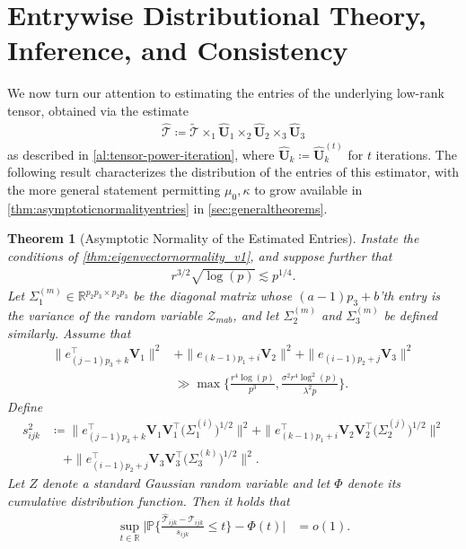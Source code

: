 \documentclass[10pt]{article}
\newcommand{\0}{{\mathbf{0}}}
\newcommand{\1}{{\mathbf{1}}}
\renewcommand{\t}{^{\top}}
\newcommand{\uhat}{\mathbf{\hat{U}}}
\newtheorem{theorem}{Theorem}
\newcommand{\p}{\mathbb{P}}
\renewcommand{\tilde}{\widetilde}
\renewcommand{\hat}{\widehat}
\renewcommand{\hat}{\widehat}
\begin{document}
\section{Entrywise Distributional Theory, Inference, and Consistency}
\label{sec:entries}

We now turn our attention to estimating the entries of the underlying low-rank tensor, obtained via the estimate
\begin{align*}
    \mathcal{\hat T} \coloneqq \mathcal{\tilde T} \times_1 \uhat_1 \times_2 \uhat_2 \times_3 \uhat_3
\end{align*}
as described in \cref{al:tensor-power-iteration}, where $\uhat_k \coloneqq \uhat_k^{(t)}$ for $t$ iterations.  The following result characterizes the distribution of the entries of this estimator, with the more general statement permitting $\mu_0, \kappa$ to grow available in \cref{thm:asymptoticnormalityentries} in \cref{sec:generaltheorems}.

\begin{theorem}[Asymptotic Normality of the Estimated Entries] \label{thm:asymptoticnormalityentries_v1}  Instate the conditions of \cref{thm:eigenvectornormality_v1}, and suppose further that
\begin{align*}
  r^{3/2} \sqrt{\log(p)} \lesssim p^{1/4}.
\end{align*}
 Let $\Sigma^{(m)}_1 \in \mathbb{R}^{p_2 p_3 \times p_2 p_3}$ be the diagonal matrix whose $(a-1)p_3 + b$'th entry is the variance of the random variable $\mathcal{Z}_{mab}$, and let $\Sigma^{(m)}_2$ and $\Sigma^{(m)}_3$ be defined similarly.  Assume that
\begin{align*}
   \| e_{(j-1)p_3 + k}\t \mathbf{V}_1 \|^2& + \|e_{(k-1)p_1 + i} \mathbf{V}_2  \|^2 + \| e_{(i-1)p_2 + j} \mathbf{V}_3\|^2 \\
   &\gg \max\bigg\{\frac{ r^4 \log(p)}{p^{3}} ,\frac{\sigma^2 r^{4} \log^2(p)}{\lambda^2 p}\bigg\}.
  \end{align*}
Define
\begin{align*}
    s^2_{ijk} &\coloneqq  \| e_{(j-1)p_3 + k}\t \mathbf{V}_1 \mathbf{V}_1\t \big(\Sigma^{(i)}_1\big)^{1/2} \|^2 + \|e_{(k-1)p_1 + i}\t \mathbf{V}_2 \mathbf{V}_2\t\big(\Sigma^{(j)}_2\big)^{1/2} \|^2\\
    &\quad + \| e_{(i-1)p_2 + j}\t \mathbf{V}_3\mathbf{V}_3\t \big( \Sigma^{(k)}_3 \big)^{1/2}\|^2.
\end{align*}
Let $Z$ denote a standard Gaussian random variable and let $\Phi$ denote its cumulative distribution function. Then it holds that
\begin{align*}
    \sup_{t\in\mathbb{R}} \bigg| \p\bigg\{ \frac{ \mathcal{\hat T}_{ijk} - \mathcal{T}_{ijk}}{s_{ijk}} \leq t \bigg\} - \Phi(t) \bigg| &= o(1).  
\end{align*}
\end{theorem}
\end{document}

